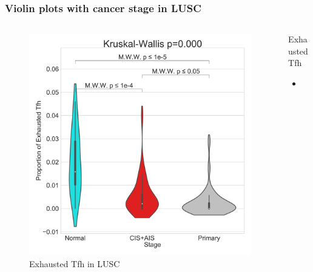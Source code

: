 \documentclass{beamer}
\begin{document}
                \begin{frame}
                    \frametitle{Violin plots with cancer stage in LUSC}

                    \begin{columns}
                        \begin{column}{0.4 \textwidth}
                            \begin{figure}
                                \includegraphics[width=\linewidth]{figures/BisqueRNA/violin/STAR.TPM.GSE131907.SQC/ExhaustedTfh.pdf}
                                \caption{Exhausted Tfh in LUSC}
                            \end{figure}
                        \end{column}
                        \begin{column}{0.55 \textwidth}
                            \begin{block}{Exhausted Tfh}
                                \begin{itemize}
                                    \item
                                \end{itemize}
                            \end{block}
                        \end{column}
                    \end{columns}
                \end{frame}
\end{document}
